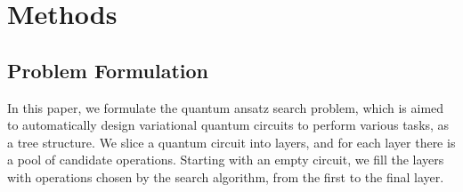 \documentclass[a4paper,onecolumn,11pt]{quantumarticle}
\begin{document}

\section{Methods}\label{methods}
\subsection{Problem Formulation}
In this paper, we formulate the quantum ansatz search problem, which is aimed to automatically design variational quantum circuits to perform various tasks, as a tree structure. We slice a quantum circuit into layers, and for each layer there is a pool of candidate operations. Starting with an empty circuit, we fill the layers with operations chosen by the search algorithm, from the first to the final layer. 
\end{document}

